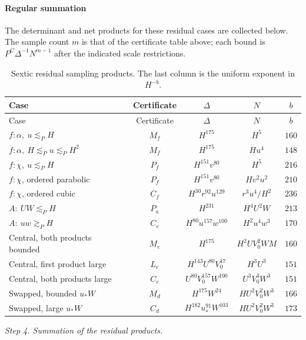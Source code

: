 \documentclass[11pt]{amsart}
\theoremstyle{definition}
\theoremstyle{remark}
\numberwithin{equation}{section}
\begin{document}
\paragraph{Regular summation}

The determinant and net products for these residual cases are collected below. The sample count $m$ is that of the certificate table above; each bound is $P^C\Delta^{-1}N^{m-1}$ after the indicated scale restrictions.
{\small
\begin{longtable}{lcccc}
\caption{Sextic residual sampling products. The last column is the uniform exponent in $H^{-b}$.}\label{low:6:regular-products}\\
Case & Certificate & $\Delta$ & $N$ & $b$\\\hline
\endfirsthead
Case & Certificate & $\Delta$ & $N$ & $b$\\\hline
\endhead
$f:\alpha,\ u\lesssim_PH$ & $M_f$ & $H^{175}$ & $H^5$ & $160$\\
$f:\alpha,\ H\lesssim_Pu\lesssim_PH^2$ & $M_f$ & $H^{175}$ & $Hu^4$ & $148$\\
$f:\chi,\ u\lesssim_PH$ & $P_f$ & $H^{151}v^{80}$ & $H^5$ & $216$\\
$f:\chi$, ordered parabolic & $P_f$ & $H^{151}v^{80}$ & $Hv^2u^2$ & $210$\\
$f:\chi$, ordered cubic & $C_f$ & $H^{30}r^{92}u^{129}$ & $r^3u^4/H^2$ & $236$\\
$A:\ UW\lesssim_PH$ & $P_a$ & $H^{231}$ & $H^4U^2W$ & $213$\\
$A:\ uw\gtrsim_PH$ & $C_e$ & $H^{80}u^{157}w^{100}$ & $H^2u^4w^3$ & $170$\\
Central, both products bounded & $M_e$ & $H^{175}$ & $H^2UV_0^2WM$ & $160$\\
Central, first product large & $L_e$ & $H^{143}U^{80}V_0^{17}$ & $H^3U^3$ & $151$\\
Central, both products large & $C_e$ & $U^{80}V_0^{157}W^{100}$ & $U^3V_0^3W^3$ & $151$\\
Swapped, bounded $u_*W$ & $M_d$ & $H^{175}W^{24}$ & $HU^2V_0^2W^3$ & $166$\\
Swapped, large $u_*W$ & $C_d$ & $H^{182}u_*^{91}W^{103}$ & $HU^2V_0^2W^3$ & $173$\\
\end{longtable}
}

\par\smallskip\noindent\textit{Step 4. Summation of the residual products.}\par\nobreak\smallskip
\end{document}
